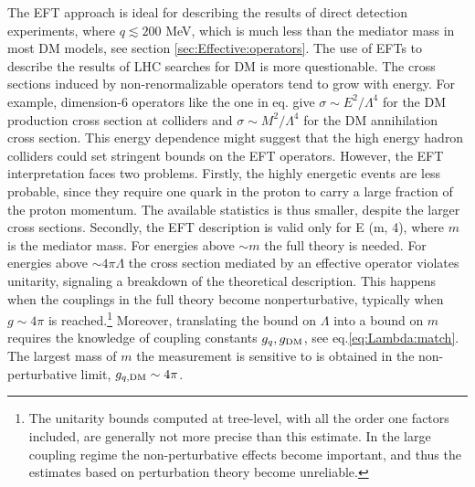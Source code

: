 The EFT approach is ideal for describing the results of direct detection experiments, where $q\lesssim 200$ MeV, which is much less than the mediator mass in most DM models, see section \ref{sec:Effective:operators}. 
The use of EFTs to describe the results of LHC searches for DM is more questionable. 
The cross sections induced by non-renormalizable operators tend to grow with energy.
For example, dimension-6 operators like the one in eq. give $\sigma \sim E^2/\Lambda^4$  
for the DM production cross section at colliders
and $\sigma \sim M^2/\Lambda^4$ for the DM annihilation cross section.  This energy dependence might suggest that the high energy hadron colliders could set stringent bounds on the EFT operators. 
However, the EFT interpretation faces two problems. 
Firstly, the highly energetic events are less probable, since they require one quark in the proton to carry a large fraction of the proton momentum. The available statistics  is thus smaller, despite the larger cross sections. 
Secondly, the EFT description is valid only for 
\beq E \circa{<}  \min (m, 4\pi \Lambda),
\eeq
where $m$ is the mediator mass.
For energies above $\sim m$ the full theory is needed.
For energies above $\sim 4\pi \Lambda$ the cross section mediated by an
effective operator violates unitarity, signaling a breakdown of the theoretical description.  
This happens when the couplings in the full theory become nonperturbative, typically when $g \sim 4\pi$ is reached.\footnote{
The unitarity bounds computed at tree-level, with all the order one factors included, are generally not more precise than this estimate.
In the large coupling regime the non-perturbative effects become important, and thus the estimates based on perturbation theory  become unreliable.}
Moreover, translating the  bound on $\Lambda$ into a  bound on $m$
requires the knowledge of coupling constants 
$g_q, g_{\rm DM}$, see eq.\eqref{eq:Lambda:match}. 
The largest mass of $m$ the measurement is sensitive to is obtained in the non-perturbative limit, 
$g_{q,{\rm DM}}\sim 4\pi$. 

